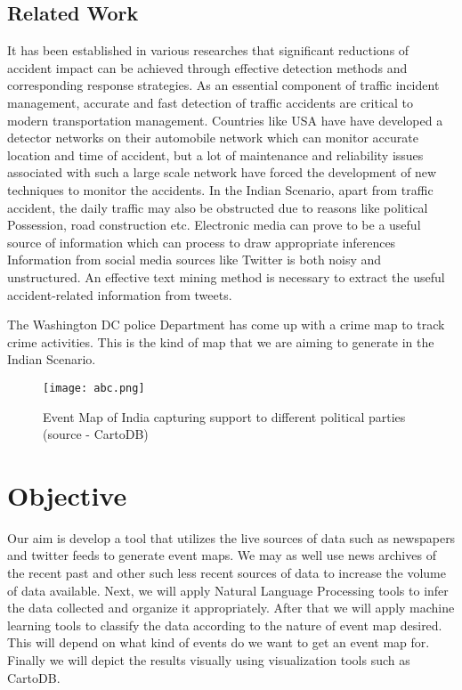 \documentclass[a4paper,11pt]{article}
\begin{document}
\subsection{Related Work \cite{workdone}}


It has been established in various researches that significant reductions of accident impact can be achieved through effective detection methods and corresponding response strategies. As an essential component of traffic incident management, accurate and fast detection of traffic accidents are critical to modern transportation management. Countries like USA have have developed a detector networks on their automobile network which can monitor accurate location and time of accident, but a lot of maintenance and reliability issues associated with such a large scale network have forced the development of new techniques to monitor the accidents. In the Indian Scenario, apart from traffic accident, the daily traffic may  also be obstructed due to reasons like political Possession, road construction etc. Electronic media can prove to be a useful source of information which can process to draw appropriate inferences
Information from social media sources like Twitter is both noisy and unstructured. An effective text mining method is necessary to extract the useful accident-related information from tweets.  
\vspace{\baselineskip}

The Washington DC police Department has come up with a crime map \cite{crimeDC} to track crime activities. This is the kind of map that we are aiming to generate in the Indian Scenario.

\vspace{\baselineskip}
\vspace{\baselineskip}

\begin{figure}[ht!]
	\texttt{[image: abc.png]}
	\caption{Event Map of India capturing support to different political parties (source - CartoDB)\label{fig1}}
\end{figure}

\section{Objective}

Our aim is develop a tool that utilizes the live sources of data such as newspapers and twitter feeds \cite{twitcal} to generate event maps. We may as well use news archives of the recent past and other such less recent sources of data to increase the volume of data available. Next, we will apply Natural Language Processing tools to infer the data collected and organize it appropriately. After that we will apply machine learning tools to classify the data according to the nature of event map desired. This will depend on what kind of events do we want to get an event map for. Finally we will depict the results visually using visualization tools such as CartoDB.
\end{document}
